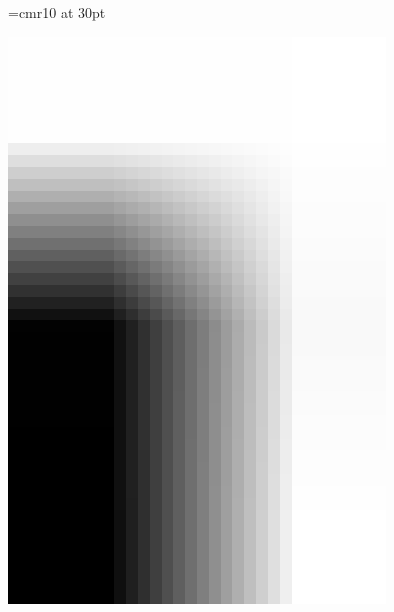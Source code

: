 \documentclass[a4paper]{report}
\begin{document}
\pagestyle{empty}
\font\tinyfont=cmr10 at 30pt

\scriptsize

\includegraphics[width=10cm]{elements/elementline}
\end{document}
